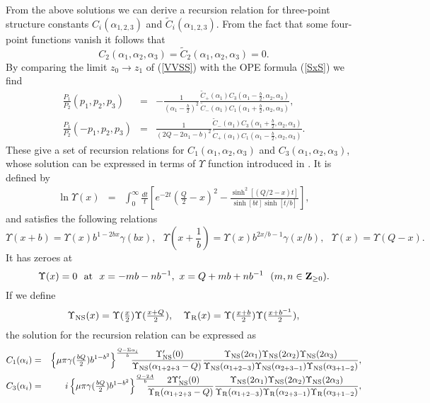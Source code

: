 \documentclass[a4paper,12pt]{article}
\newcommand{\tfrac}[2]{{\textstyle\frac{#1}{#2}}}
\newcommand{\Up}{{\Upsilon}}
\newcommand{\NS}{{\rm NS}}
\newcommand{\R}{{\rm R}}
\begin{document}
   From the above solutions we can derive a recursion relation for
 three-point structure constants $C_i(\alpha_{1,2,3})$ and
 $\tilde{C}_i(\alpha_{1,2,3})$.
 From the fact that some four-point functions vanish it follows that
\begin{equation}
  C_2(\alpha_1,\alpha_2,\alpha_3)
 =\tilde{C}_2(\alpha_1,\alpha_2,\alpha_3)=0.
\end{equation}
 By comparing the limit $z_0\rightarrow z_1$ of (\ref{VVSS})
 with the OPE formula (\ref{SxS}) we find
\begin{eqnarray}
  \frac{P_1}{P_2}(p_1,p_2,p_3) &=&
 -\frac{1}{(\alpha_1-\frac{b}{2})^2}
  \frac{\tilde{C}_+(\alpha_1)C_3(\alpha_1-\frac{b}{2},\alpha_2,\alpha_3)}
       {\tilde{C}_-(\alpha_1)C_1(\alpha_1+\frac{b}{2},\alpha_2,\alpha_3)},
 \nonumber \\
  \frac{P_1}{P_2}(-p_1,p_2,p_3) &=&
  \frac{1}{(2Q-2\alpha_1-b)^2}
  \frac{\tilde{C}_-(\alpha_1)C_3(\alpha_1+\frac{b}{2},\alpha_2,\alpha_3)}
       {\tilde{C}_+(\alpha_1)C_1(\alpha_1-\frac{b}{2},\alpha_2,\alpha_3)}.
\end{eqnarray}
 These give a set of recursion relations for
 $C_1(\alpha_1,\alpha_2,\alpha_3)$ and
 $C_3(\alpha_1,\alpha_2,\alpha_3)$, whose solution can be expressed
 in terms of $\Up$ function introduced in \cite{DO,ZZ2}.
 It is defined by
\begin{eqnarray}
 \ln\Up(x)  &=& \int_0^\infty \frac{dt}{t}\left[
    e^{-2t}(\tfrac{Q}{2}-x)^2 -\frac{\sinh^2[(Q/2-x)t]}{\sinh[bt]\sinh[t/b]}
   \right],
\end{eqnarray}
 and satisfies the following relations
\begin{equation}
  \Up(x+b)=\Up(x)b^{1-2bx}\gamma(bx),~~~
  \Up(x+\tfrac{1}{b})=\Up(x)b^{2x/b-1}\gamma(x/b),~~~
  \Up(x) =\Up(Q-x).
\end{equation}
 It has zeroes at
\begin{equation}
  \Up(x)=0~~{\rm at}~~x=-mb-nb^{-1},~x=Q+mb+nb^{-1}~~(m,n\in {\bf Z}_{\ge 0}).
\end{equation}
 If we define
\begin{equation}
 \Up_\NS(x) = \Up(\tfrac{x}{2})\Up(\tfrac{x+Q}{2}),~~~
 \Up_\R(x)  = \Up(\tfrac{x+b}{2})\Up(\tfrac{x+b^{-1}}{2}),
\end{equation}
 the solution for the recursion relation can be expressed as
\begin{eqnarray}
  C_1(\alpha_i)
 &=&\left\{\mu\pi\gamma(\tfrac{bQ}{2})b^{1-b^2}\right\}^
     {\frac{Q-\Sigma\alpha_i}{b}}
    \hskip-4mm
    \frac{~~\Up_\NS'(0)}{\Up_\NS(\alpha_{1+2+3}-Q)}
 \frac{\Up_\NS(2\alpha_1)\Up_\NS(2\alpha_2)\Up_\NS(2\alpha_3)}
      {\Up_\NS(\alpha_{1+2-3})\Up_\NS(\alpha_{2+3-1})\Up_\NS(\alpha_{3+1-2})},
 \nonumber \\
  C_3(\alpha_i)
&=&i\left\{\mu\pi\gamma(\tfrac{bQ}{2})b^{1-b^2}\right\}^{\frac{Q-2A}{b}}
    \hskip-4mm
    \frac{~~2\Up_\NS'(0)}{\Up_\R(\alpha_{1+2+3}-Q)}
 \frac{\Up_\NS(2\alpha_1)\Up_\NS(2\alpha_2)\Up_\NS(2\alpha_3)}
      {\Up_\R(\alpha_{1+2-3})\Up_\R(\alpha_{2+3-1})\Up_\R(\alpha_{3+1-2})},
\label{VVV}
\end{eqnarray}
\end{document}

